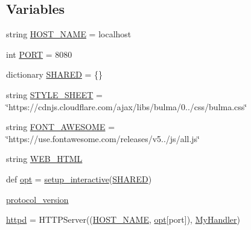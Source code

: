 \subsection*{Variables}
\begin{DoxyCompactItemize}
\item 
string \hyperlink{namespaceparlai_1_1scripts_1_1interactive__web_ac440a61641ae161806beba8dbb9d39b8}{H\+O\+S\+T\+\_\+\+N\+A\+ME} = \textquotesingle{}localhost\textquotesingle{}
\item 
int \hyperlink{namespaceparlai_1_1scripts_1_1interactive__web_adab4200a8fab70115b4a5c6592ba596a}{P\+O\+RT} = 8080
\item 
dictionary \hyperlink{namespaceparlai_1_1scripts_1_1interactive__web_a86b356c6390faf2398bdbde02a6664d6}{S\+H\+A\+R\+ED} = \{\}
\item 
string \hyperlink{namespaceparlai_1_1scripts_1_1interactive__web_a337c6d5539295b610d84bd51e40e7122}{S\+T\+Y\+L\+E\+\_\+\+S\+H\+E\+ET} = \char`\"{}https\+://cdnjs.\+cloudflare.\+com/ajax/libs/bulma/0../css/bulma.\+css\char`\"{}
\item 
string \hyperlink{namespaceparlai_1_1scripts_1_1interactive__web_aac64fc5183abcbf6b44570b3a16ba911}{F\+O\+N\+T\+\_\+\+A\+W\+E\+S\+O\+ME} = \char`\"{}https\+://use.\+fontawesome.\+com/releases/v5../js/all.\+js\char`\"{}
\item 
string \hyperlink{namespaceparlai_1_1scripts_1_1interactive__web_a85a34a78e56c0f8deaf960a2df2bcfc8}{W\+E\+B\+\_\+\+H\+T\+ML}
\item 
def \hyperlink{namespaceparlai_1_1scripts_1_1interactive__web_a022cc4d0c500e7a2ba643446d3b0e6ef}{opt} = \hyperlink{namespaceparlai_1_1scripts_1_1interactive__web_abeab09cab4f9e60077ffd5050bff36ef}{setup\+\_\+interactive}(\hyperlink{namespaceparlai_1_1scripts_1_1interactive__web_a86b356c6390faf2398bdbde02a6664d6}{S\+H\+A\+R\+ED})
\item 
\hyperlink{namespaceparlai_1_1scripts_1_1interactive__web_a8a3d9062157e9703a21ded9885420c12}{protocol\+\_\+version}
\item 
\hyperlink{namespaceparlai_1_1scripts_1_1interactive__web_af01d14f8f733bc94f7aaab006021b83b}{httpd} = H\+T\+T\+P\+Server((\hyperlink{namespaceparlai_1_1scripts_1_1interactive__web_ac440a61641ae161806beba8dbb9d39b8}{H\+O\+S\+T\+\_\+\+N\+A\+ME}, \hyperlink{namespaceparlai_1_1scripts_1_1interactive__web_a022cc4d0c500e7a2ba643446d3b0e6ef}{opt}\mbox{[}\textquotesingle{}port\textquotesingle{}\mbox{]}), \hyperlink{classparlai_1_1scripts_1_1interactive__web_1_1MyHandler}{My\+Handler})
\end{DoxyCompactItemize}


